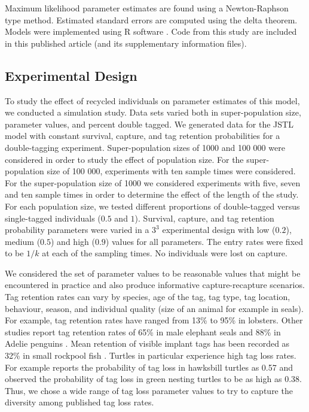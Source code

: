 \documentclass[12pt]{article}
\begin{document}
Maximum likelihood parameter estimates are found using a Newton-Raphson type
method. Estimated standard errors are computed using the delta theorem.
Models were implemented using R software \citep{R}. Code from this study are included in this published article (and its supplementary information files).


\subsection{Experimental Design}\label{experimental-design}

To study the effect of recycled individuals on parameter estimates of
this model, we conducted a simulation study. Data sets varied both in super-population size,
parameter values, and percent double tagged. We generated data for the
JSTL model with constant survival, capture, and tag retention
probabilities for a double-tagging experiment. Super-population sizes of
1000 and 100 000 were considered in order to study the effect of population size. For the super-population size
of 100 000, experiments with ten sample times were considered. For
the super-population size of 1000 we considered experiments with five,
seven and ten sample times in order to determine the effect of the length of
the study. For each population size, we
tested different proportions of double-tagged versus single-tagged
individuals (\(0.5\) and \(1\)). Survival, capture, and tag retention
probability parameters were varied in a \(3^3\) experimental design with
low (\(0.2\)), medium (\(0.5\)) and high (\(0.9\)) values for all
parameters. The entry rates were fixed to be $1/k$ at each of the
sampling times. No individuals were lost on capture.

We considered the set of parameter values to be reasonable values that might be encountered in practice and also produce informative capture-recapture scenarios.  Tag retention rates can vary by species, age of the tag, tag type, tag location, behaviour, season, and individual quality (size of an animal for example in seals).  For example, tag retention rates have ranged from 13\% \citep{Fogarty:1980} to 95\% \citep{Gonzalez:2012} in lobsters.  Other studies report tag retention rates of 65\% in male elephant seals \citep{Pistorius:2000} and 88\% in Adelie penguins \citep{Ainley:1980}.  Mean retention of visible implant tags has been recorded as 32\% in small rockpool fish \citep{Griffiths:2002}. Turtles in particular experience high tag loss rates.  For example \cite{Bellini:2001} reports the probability of tag loss in hawksbill turtles as 0.57 and    \cite{Bjorndal:1996} observed the probability of tag loss  in green nesting turtles to be as high as 0.38.   Thus, we chose a wide range of tag loss parameter values to try to capture the diversity among published tag loss rates.
\end{document}
